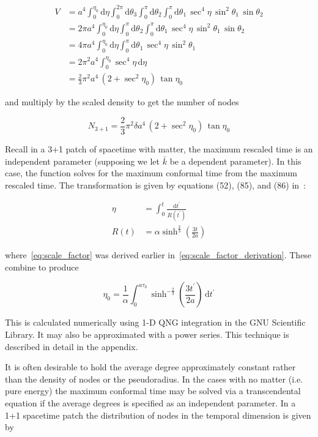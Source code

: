 \documentclass[preprint,notitlepage,amsmath,amssymb,floatfix]{revtex4-1}
\begin{document}
\begin{equation}
\begin{split}
V &= a^4\int_0^{\eta_0}\!\mathrm{d}\eta\int_0^{2\pi}\!\mathrm{d}\theta_3\int_0^\pi\!\mathrm{d}\theta_2\int_0^\pi\!\mathrm{d}\theta_1\,\sec^4\eta\,\sin^2\theta_1\,\sin\theta_2 \\
  &= 2\pi a^4\int_0^{\eta_0}\!\mathrm{d}\eta\int_0^\pi\!\mathrm{d}\theta_2\int_0^\pi\!\mathrm{d}\theta_1\,\sec^4\eta\,\sin^2\theta_1\,\sin\theta_2 \\
  &= 4\pi a^4\int_0^{\eta_0}\!\mathrm{d}\eta\int_0^\pi\!\mathrm{d}\theta_1\,\sec^4\eta\,\sin^2\theta_1 \\
  &= 2\pi^2 a^4\int_0^{\eta_0}\!\sec^4\eta\,\mathrm{d}\eta \\
  &= \frac{2}{3}\pi^2 a^4\,\left(2+\sec^2\eta_0\right)\,\tan\eta_0
\end{split}
\end{equation}

\noindent and multiply by the scaled density to get the number of nodes

\begin{equation}
\label{eq:finalN3}
N_{\mathrm{3+1}} = \frac{2}{3}\pi^2\delta a^4\,\left(2+\sec^2\eta_0\right)\,\tan\eta_0
\end{equation}

\noindent Recall in a 3+1 patch of spacetime with matter, the maximum rescaled time is an independent parameter (supposing we let $\bar{k}$ be a dependent parameter).
In this case, the function solves for the maximum conformal time from the maximum rescaled time.
The transformation is given by equations (52), (85), and (86) in~\cite{ref:snc2012}:

\begin{align}
\eta &= \int_0^t\!\frac{\mathrm dt^\prime}{R\left(t^\prime\right)} \label{eq:t_to_eta} \\
R\left(t\right) &= \alpha\sinh^{\frac{2}{3}}\left(\frac{3t}{2a}\right) \label{eq:scale_factor}
\end{align}

\noindent where~\eqref{eq:scale_factor} was derived earlier in~\eqref{eq:scale_factor_derivation}.
These combine to produce

\begin{equation}
\eta_0 = \frac{1}{\alpha}\int_0^{a\tau_0}\!\sinh^{-\frac{2}{3}}\left(\frac{3t^\prime}{2a}\right)\,\mathrm dt^\prime
\end{equation}

\noindent This is calculated numerically using 1-D QNG integration in the GNU Scientific Library.  It may also be approximated with a power series.  This technique is described in detail in the appendix. \par
It is often desirable to hold the average degree approximately constant rather than the density of nodes or the pseudoradius.  
In the cases with no matter (i.e. pure energy) the maximum conformal time may be solved via a transcendental equation if the average degrees is specified as an independent parameter.
In a 1+1 spacetime patch the distribution of nodes in the temporal dimension is given by
\end{document}
